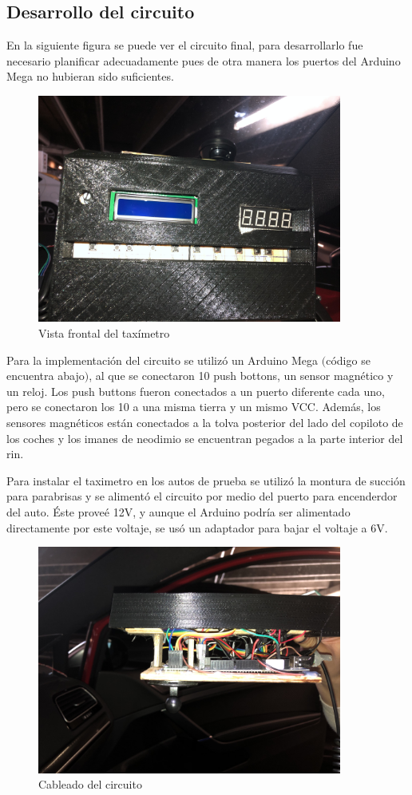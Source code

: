 \documentclass[a4paper,11pt]{article}
\begin{document}
\newpage
\subsection*{Desarrollo del circuito}
En la siguiente figura se puede ver el circuito final, para desarrollarlo fue necesario planificar adecuadamente 
pues de otra manera los puertos del Arduino Mega no hubieran sido suficientes.

\begin{figure}[h]
	\centering
	\includegraphics[width=10cm]{images/taximetro.jpg}
	\caption{Vista frontal del taxímetro}
\end{figure}
Para la implementación del circuito se utilizó un Arduino Mega $($código se encuentra abajo$)$, al que se conectaron 
10 push bottons, un sensor magnético y un reloj. Los push buttons fueron conectados a un puerto diferente cada uno, 
pero se conectaron los 10 a una misma tierra y un mismo VCC. Además, los sensores magnéticos están conectados a
la tolva posterior del lado del copiloto de los coches y los imanes de neodimio se encuentran pegados a la parte interior del rin.

Para instalar el taximetro en los autos de prueba se utilizó la montura de succión para parabrisas y se alimentó el circuito por medio 
del puerto para encenderdor del auto. Éste proveé 12V, y aunque el Arduino podría ser alimentado directamente por este voltaje, 
se usó un adaptador para bajar el voltaje a 6V.



\begin{figure}[h]
	\centering
	\includegraphics[width=10cm]{images/vista.jpg}
	\caption{Cableado del circuito}
\end{figure}
\end{document}
